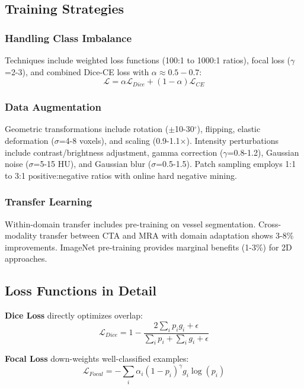 \documentclass[conference]{IEEEtran}
\begin{document}
\subsection{Training Strategies}

\subsubsection{Handling Class Imbalance}
Techniques include weighted loss functions (100:1 to 1000:1 ratios), focal loss \cite{lin2017focal} ($\gamma$=2-3), and combined Dice-CE loss with $\alpha \approx 0.5-0.7$:
\begin{equation}
\mathcal{L} = \alpha \mathcal{L}_{Dice} + (1-\alpha) \mathcal{L}_{CE}
\end{equation}

\subsubsection{Data Augmentation}
Geometric transformations include rotation ($\pm$10-30$^\circ$), flipping, elastic deformation ($\sigma$=4-8 voxels), and scaling (0.9-1.1$\times$). Intensity perturbations include contrast/brightness adjustment, gamma correction ($\gamma$=0.8-1.2), Gaussian noise ($\sigma$=5-15 HU), and Gaussian blur ($\sigma$=0.5-1.5). Patch sampling employs 1:1 to 3:1 positive:negative ratios with online hard negative mining.

\subsubsection{Transfer Learning}
Within-domain transfer includes pre-training on vessel segmentation. Cross-modality transfer between CTA and MRA with domain adaptation shows 3-8\% improvements. ImageNet pre-training provides marginal benefits (1-3\%) for 2D approaches.

\subsection{Loss Functions in Detail}

\textbf{Dice Loss} directly optimizes overlap:
\begin{equation}
\mathcal{L}_{Dice} = 1 - \frac{2\sum_{i} p_i g_i + \epsilon}{\sum_{i} p_i + \sum_{i} g_i + \epsilon}
\end{equation}

\textbf{Focal Loss} down-weights well-classified examples:
\begin{equation}
\mathcal{L}_{Focal} = -\sum_{i} \alpha_i (1-p_i)^\gamma g_i \log(p_i)
\end{equation}
\end{document}
